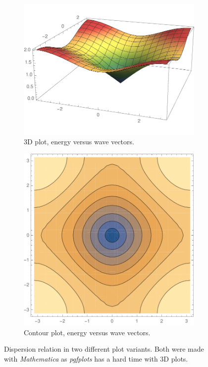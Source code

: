 \documentclass[11pt, english, fleqn, DIV=15, headinclude, BCOR=1cm]{scrartcl}
\begin{document}
\begin{figure}
    \centering
    \begin{subfigure}[c]{0.48\linewidth}
        \centering
        \includegraphics[width=\linewidth]{dispersion.pdf}
        \caption{%
            3D plot, energy versus wave vectors.
        }
        \label{fig:dispersion/1}
    \end{subfigure}
    \hfill
    \begin{subfigure}[c]{0.48\linewidth}
        \centering
        \includegraphics[width=\linewidth]{contour.pdf}
        \caption{%
            Contour plot, energy versus wave vectors.
        }
        \label{fig:dispersion/2}
    \end{subfigure}
    \caption{%
        Dispersion relation in two different plot variants. Both were made with
        \emph{Mathematica} as \emph{pgfplots} has a hard time with 3D plots.
    }
    \label{fig:dispersion}
\end{figure}
\end{document}
